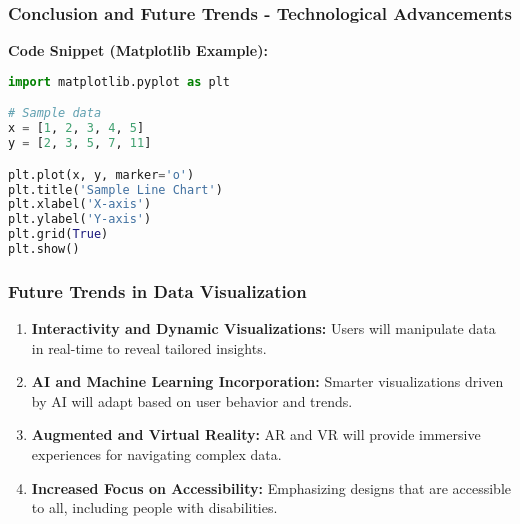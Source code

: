 \documentclass{beamer}
\begin{document}
\begin{frame}[fragile]
    \frametitle{Conclusion and Future Trends - Technological Advancements}
    \textbf{Code Snippet (Matplotlib Example):}
    \begin{lstlisting}[language=Python]
import matplotlib.pyplot as plt

# Sample data
x = [1, 2, 3, 4, 5]
y = [2, 3, 5, 7, 11]

plt.plot(x, y, marker='o')
plt.title('Sample Line Chart')
plt.xlabel('X-axis')
plt.ylabel('Y-axis')
plt.grid(True)
plt.show()
    \end{lstlisting}
\end{frame}

\begin{frame}[fragile]
    \frametitle{Future Trends in Data Visualization}
    \begin{enumerate}
        \item \textbf{Interactivity and Dynamic Visualizations:} 
        Users will manipulate data in real-time to reveal tailored insights.
        
        \item \textbf{AI and Machine Learning Incorporation:} 
        Smarter visualizations driven by AI will adapt based on user behavior and trends.
        
        \item \textbf{Augmented and Virtual Reality:} 
        AR and VR will provide immersive experiences for navigating complex data.
        
        \item \textbf{Increased Focus on Accessibility:} 
        Emphasizing designs that are accessible to all, including people with disabilities.
    \end{enumerate}
\end{frame}
\end{document}
